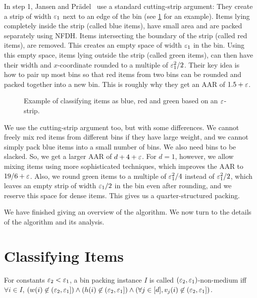 In step 1, Jansen and Pr\"adel~\cite{jansen2016new,pradel-thesis}
use a standard cutting-strip argument:
They create a strip of width $\varepsilon_1$ next to an edge of the bin
(see \cref{fig:eps-strip} for an example).
Items lying completely inside the strip (called blue items),
have small area and are packed separately using NFDH.
Items intersecting the boundary of the strip (called red items), are removed.
This creates an empty space of width $\varepsilon_1$ in the bin.
Using this empty space, items lying outside the strip (called green items),
can then have their width and $x$-coordinate rounded to a multiple of $\varepsilon_1^2/2$.
Their key idea is how to pair up most bins so that red items from two bins
can be rounded and packed together into a new bin.
This is roughly why they get an AAR of $1.5+\varepsilon$.

\begin{figure}[htb]
\centering

\caption{Example of classifying items as blue, red and green based on an $\varepsilon$-strip.}
\label{fig:eps-strip}
\end{figure}

We use the cutting-strip argument too, but with some differences.
We cannot freely mix red items from different bins if they have large weight,
and we cannot simply pack blue items into a small number of bins.
We also need bins to be slacked. So, we get a larger AAR of $d+4+\varepsilon$.
For $d=1$, however, we allow mixing items using more sophisticated techniques,
which improves the AAR to $19/6+\varepsilon$.
Also, we round green items to a multiple of $\varepsilon_1^2/4$ instead of $\varepsilon_1^2/2$,
which leaves an empty strip of width $\varepsilon_1/2$ in the bin
even after rounding, and we reserve this space for dense items.
This gives us a quarter-structured packing.

We have finished giving an overview of the algorithm.
We now turn to the details of the algorithm and its analysis.

\section{Classifying Items}
\label{sec:gv-rbbp:classify}

\begin{definition}
For constants $\varepsilon_2 < \varepsilon_1$, a bin packing instance $I$
is called $(\varepsilon_2, \varepsilon_1)$-non-medium iff $\forall i \in I$,
$(w(i) \not\in (\varepsilon_2, \varepsilon_1])
\wedge (h(i) \not\in (\varepsilon_2, \varepsilon_1])
\wedge (\forall j \in [d], v_j(i) \not\in (\varepsilon_2, \varepsilon_1])$.
\end{definition}

